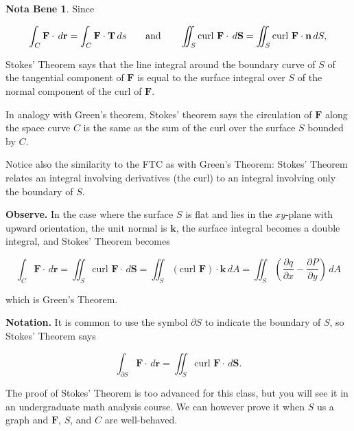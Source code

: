 \documentclass[11pt,oneside,english]{amsart}
\theoremstyle{definition}
\newtheorem*{note}{Nota Bene}
\newcommand{\aspace}{\hspace{7mm}\text{and}\hspace{7mm}}
\newcommand{\pp}[2]{\frac{\partial{#1}}{\partial{#2}}}
\begin{document}
\begin{note}
Since

\[
\int_C\mathbf{F}\cdot\,d\mathbf{r}=\int_C\mathbf{F}\cdot\mathbf{T}\,ds\aspace \iint_S\text{curl }\mathbf{F}\cdot\,d\mathbf{S}=\iint_S\text{curl }\mathbf{F}\cdot\mathbf{n}\,dS,
\]

Stokes' Theorem says that the line integral around the boundary curve of $S$ of the tangential component of $\mathbf{F}$ is equal to the surface integral over $S$ of the normal component of the curl of $\mathbf{F}$.

In analogy with Green's theorem, Stokes' theorem says the circulation of $\mathbf{F}$ along the space curve $C$ is the same as the sum of the curl over the surface $S$ bounded by $C$.

Notice also the similarity to the FTC as with Green's Theorem: Stokes' Theorem relates an integral involving derivatives (the curl) to an integral involving only the boundary of $S$.

\textbf{Observe.} In the case where the surface $S$ is flat and lies in the $xy$-plane with upward orientation, the unit normal is $\mathbf{k}$, the surface integral becomes a double integral, and Stokes' Theorem becomes

\[
\int_C\mathbf{F}\cdot\,d\mathbf{r}=\iint_S\text{curl }\mathbf{F}\cdot\,d\mathbf{S}=\iint_S(\text{curl }\mathbf{F})\cdot\mathbf{k}\,dA=\iint_S\left(\pp{q}{x}-\pp{P}{y}\right)\,dA
\]

which is Green's Theorem.
\end{note}

\textbf{Notation.} It is common to use the symbol $\partial S$ to indicate the boundary of $S$, so Stokes' Theorem says 

\[
\int_{\partial S}\mathbf{F}\cdot\,d\mathbf{r}=\iint_S\text{curl }\mathbf{F}\cdot\,d\mathbf{S}.
\]




The proof of Stokes' Theorem is too advanced for this class, but you will see it in an undergraduate math analysis course. We can however prove it when $S$ us a graph and $\mathbf{F}$, $S$, and $C$ are well-behaved.
\end{document}
